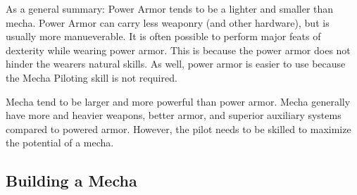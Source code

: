 \documentclass[twoside]{book}
\begin{document}
    {  
    As a general summary: Power Armor tends to be a lighter and smaller than mecha. Power Armor can carry less weaponry (and other hardware), but is usually more manueverable. It is often possible to perform major feats of dexterity while wearing power armor. This is because the power armor does not hinder the wearers natural skills. As well, power armor is easier to use because the Mecha Piloting skill is not required.
    }
  
    {  
    Mecha tend to be larger and more powerful than power armor. Mecha generally have more and heavier weapons, better armor, and superior auxiliary systems compared to powered armor. However, the pilot needs to be skilled to maximize the potential of a mecha.
    }
  
    

\subsection{Building a Mecha}
    
\end{document}
